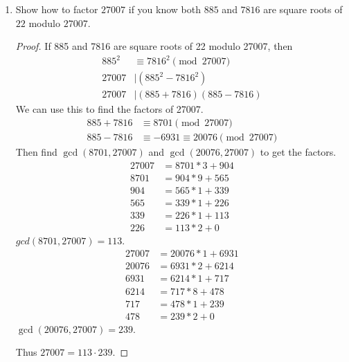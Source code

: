 \documentclass[11pt]{article}
\theoremstyle{definition}
\begin{document}
\begin{enumerate}
    \item Show how to factor $27007$ if you know both $885$ and $7816$ are square roots of $22$ modulo $27007$.
    \begin{proof}
        If 885 and 7816 are square roots of 22 modulo 27007, then 
        \begin{align*}
            885^2 &\equiv 7816^2\pmod{27007} \\
            27007 &\mid (885^2-7816^2) \\
            27007 &\mid (885+7816)(885-7816)
        \end{align*}
        We can use this to find the factors of 27007. 
        \begin{align*}
            885+7816 &\equiv 8701\pmod{27007} \\
            885-7816 &\equiv -6931\equiv 20076\pmod{27007}
        \end{align*}
        Then find $\gcd(8701,27007)$ and $\gcd(20076,27007)$ to get the factors. 
        \begin{align*}
            27007 &= 8701*3 + 904 \\
            8701  &= 904*9 + 565 \\
            904   &= 565*1 + 339 \\
            565   &= 339*1 + 226 \\
            339   &= 226*1 + 113 \\
            226   &= 113*2 + 0
        \end{align*}
        $gcd(8701,27007) = 113$.
        \begin{align*}
            27007 &= 20076*1 + 6931 \\
            20076 &= 6931*2 + 6214 \\
            6931  &= 6214*1 + 717 \\
            6214  &= 717*8 + 478 \\
            717   &= 478*1 + 239 \\
            478   &= 239*2 + 0 
        \end{align*}
        $\gcd(20076,27007) = 239$.

        Thus $27007 = 113 \cdot 239$.
    \end{proof}


\end{enumerate}
\end{document}
